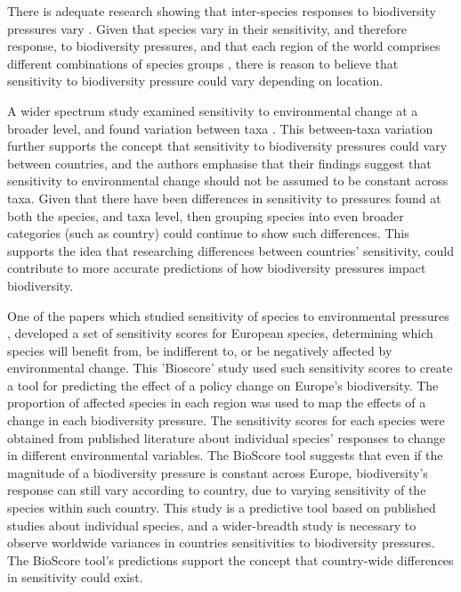 \documentclass[11pt, a4paper, titlepage]{article}
\begin{document}
	There is adequate research showing that inter-species responses to biodiversity pressures vary \citep{foden2013identifying}. Given that species vary in their sensitivity, and therefore response, to biodiversity pressures, and that each region of the world comprises different combinations of species groups \citep{goethem2021biodiversity}, there is reason to believe that sensitivity to biodiversity pressure could vary depending on location. \newline
	
	A wider spectrum study examined sensitivity to environmental change at a broader level, and found variation between taxa \citep{sunday2015species}. This between-taxa variation further supports the concept that sensitivity to biodiversity pressures could vary between countries, and the authors emphasise that their findings suggest that sensitivity to environmental change should not be assumed to be constant across taxa. Given that there have been differences in sensitivity to pressures found at both the species, and taxa level, then grouping species into even broader categories (such as country) could continue to show such differences. This supports the idea that researching differences between countries' sensitivity, could contribute to more accurate predictions of how biodiversity pressures impact biodiversity. \newline
	
	One of the papers which studied sensitivity of species to environmental pressures \citep{louette2010bioscore}, developed a set of sensitivity scores for European species, determining which species will benefit from, be indifferent to, or be negatively affected by environmental change. This 'Bioscore' study used such sensitivity scores to create a tool for predicting the effect of a policy change on Europe's biodiversity. The proportion of  affected species in each region was used to map the effects of a change in each biodiversity pressure. The sensitivity scores for each species were obtained from published literature about individual species' responses to change in different environmental variables. The BioScore tool suggests that even if the magnitude of a biodiversity pressure is constant across Europe, biodiversity's response can still vary according to country, due to varying sensitivity of the species within such country. This study is a predictive tool based on published studies about individual species, and a wider-breadth study is necessary to observe worldwide variances in countries sensitivities to biodiversity pressures. The BioScore tool's predictions support the concept that country-wide differences in sensitivity could exist. \newline
	
\end{document}

